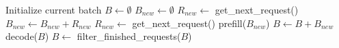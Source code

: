 \algrenewcommand\algorithmicindent{1em}
\begin{algorithm}[t!]
\caption{\Ils (vLLM). Prefills are executed eagerly (lines 8-9), potentially introducing a generation stall for ongoing decodes (line 12).}
\label{alg:iteration_level}
\begin{algorithmic}[1]
\State Initialize current batch $B \leftarrow \emptyset$
    \State $B_{new} \leftarrow \emptyset$
    \State $R_{new} \leftarrow$ get\_next\_request()
        \State $B_{new} \leftarrow B_{new} + R_{new}$ 
        \State $R_{new} \leftarrow$ get\_next\_request()
    \EndWhile
        \State prefill($B_{new}$) %
        \State $B \leftarrow B + B_{new}$
    \Else
        \State decode($B$) %
    \EndIf
    \State $B \leftarrow$ filter\_finished\_requests($B$)
\EndWhile
\end{algorithmic}
\end{algorithm}
